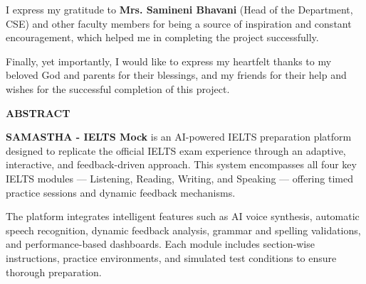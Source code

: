 \documentclass[a4paper,12pt]{article}
\begin{document}
\vspace{0.5cm}
\noindent
I express my gratitude to \textbf{Mrs. Samineni Bhavani} (Head of the Department, CSE) and other faculty members for being a source of inspiration and constant encouragement, which helped me in completing the project successfully.

\vspace{0.5cm}
\noindent
Finally, yet importantly, I would like to express my heartfelt thanks to my beloved God and parents for their blessings, and my friends for their help and wishes for the successful completion of this project.




\newpage
\tableofcontents

\newpage
\listoffigures


\newpage
{}
{}
\begin{center}
\textbf{\LARGE ABSTRACT}
\end{center}

\vspace{1cm}

\noindent
\textbf{SAMASTHA - IELTS Mock} is an AI-powered IELTS preparation platform designed to replicate the official IELTS exam experience through an adaptive, interactive, and feedback-driven approach. This system encompasses all four key IELTS modules — Listening, Reading, Writing, and Speaking — offering timed practice sessions and dynamic feedback mechanisms.

\vspace{0.5cm}

The platform integrates intelligent features such as AI voice synthesis, automatic speech recognition, dynamic feedback analysis, grammar and spelling validations, and performance-based dashboards. Each module includes section-wise instructions, practice environments, and simulated test conditions to ensure thorough preparation.
\end{document}
